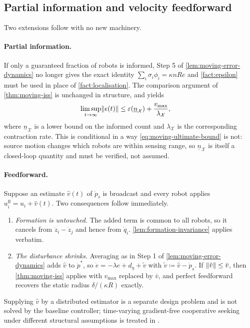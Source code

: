 \documentclass[11pt,a4paper]{article}
\theoremstyle{plain}
\theoremstyle{definition}
\DeclarePairedDelimiter{\norm}{\lVert}{\rVert}
\begin{document}
\subsection{Partial information and velocity feedforward}\label{sec:gap2-partial}

Two extensions follow with no new machinery.

\paragraph{Partial information.}
If only a guaranteed fraction of robots is informed, Step 5 of
\cref{lem:moving-error-dynamics} no longer gives the exact identity $\sum_i\sigma_i\phi_i=\kappa nRe$
and \cref{fact:epsilon} must be used in place of \cref{fact:localisation}. The comparison
argument of \cref{thm:moving-iss} is unchanged in structure, and yields
\begin{equation}\label{eq:moving-partial-bound}
    \limsup_{t\to\infty}\norm{e(t)}
    \leq\varepsilon\!\left(\underline n_{\mathcal X}\right)+\frac{v_{\max}}{\lambda_{\mathcal X}},
\end{equation}
where $\underline n_{\mathcal X}$ is a lower bound on the informed count and
$\lambda_{\mathcal X}$ is the corresponding contraction rate. This is conditional in a way
\eqref{eq:moving-ultimate-bound} is not: source motion changes which robots are within sensing
range, so $\underline n_{\mathcal X}$ is itself a closed-loop quantity and must be verified, not
assumed.

\paragraph{Feedforward.}
Suppose an estimate $\hat v(t)$ of $\dot p_s$ is broadcast and every robot applies
$u_i^{\mathrm{ff}}=u_i+\hat v(t)$. Two consequences follow immediately.
\begin{enumerate}[label=(\roman*),nosep]
    \item \emph{Formation is untouched.} The added term is common to all robots, so it cancels
    from $\dot z_i-\dot z_j$ and hence from $\dot q_i$. \cref{lem:formation-invariance} applies
    verbatim.
    \item \emph{The disturbance shrinks.} Averaging as in Step 1 of
    \cref{lem:moving-error-dynamics} adds $\hat v$ to $\dot p^*$, so
    $\dot e=-\lambda e+d_\eta+\tilde v$ with $\tilde v\coloneqq\hat v-\dot p_s$. If
    $\norm{\tilde v}\leq\bar v$, then \cref{thm:moving-iss} applies with $v_{\max}$ replaced by
    $\bar v$, and perfect feedforward recovers the static radius $\delta/(\kappa R)$ exactly.
\end{enumerate}
Supplying $\hat v$ by a distributed estimator is a separate design problem and is not solved by
the baseline controller; time-varying gradient-free cooperative seeking under different
structural assumptions is treated in \cite{michael2023}.
\end{document}
